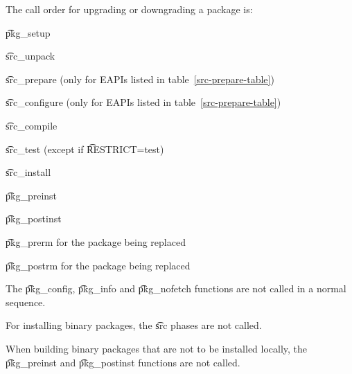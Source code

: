 The call order for upgrading or downgrading a package is:

\begin{compactitem}
\item \t{pkg\_setup}
\item \t{src\_unpack}
\item \t{src\_prepare} (only for EAPIs listed in table~\ref{src-prepare-table})
\item \t{src\_configure} (only for EAPIs listed in table~\ref{src-prepare-table})
\item \t{src\_compile}
\item \t{src\_test} (except if \t{RESTRICT=test})
\item \t{src\_install}
\item \t{pkg\_preinst}
\item \t{pkg\_postinst}
\item \t{pkg\_prerm} for the package being replaced
\item \t{pkg\_postrm} for the package being replaced
\end{compactitem}

The \t{pkg\_config}, \t{pkg\_info} and \t{pkg\_nofetch} functions are not called in a normal
sequence.

For installing binary packages, the \t{src} phases are not called.

When building binary packages that are not to be installed locally, the \t{pkg\_preinst}
and \t{pkg\_postinst} functions are not called.


